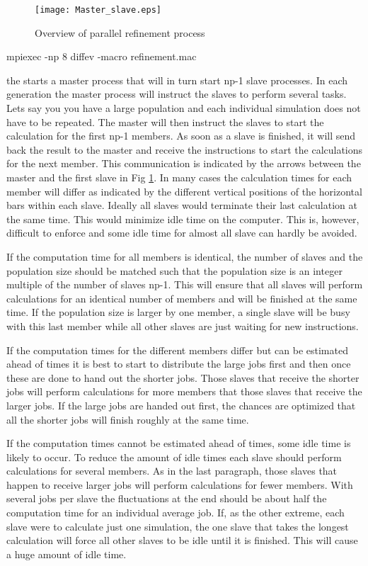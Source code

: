 \begin{figure}
   \texttt{[image: Master\_slave.eps]}
   \caption{Overview of parallel refinement process }
   \label{fevo-over}
\end{figure}

\begin{MacVerbatim}
   mpiexec -np 8 diffev -macro refinement.mac
\end{MacVerbatim}

the \Suite starts a master process that will in turn start np-1 slave 
processes. In each generation the master process will instruct the slaves
to perform several tasks. Lets say you you have a large population and
each individual simulation does not have to be repeated. The master will 
then instruct the slaves to start the calculation for the first np-1
members. As soon as a slave is finished, it will send back the result to 
the master and receive the instructions to start the calculations for
the next member. This communication is indicated by the arrows between the
 master and the first slave in Fig \ref{fevo-over}. In many cases the 
calculation times for each member will differ as indicated by the 
different vertical positions of the horizontal bars within each slave.
Ideally all slaves would terminate their last calculation at the same time. 
This would minimize idle time on the computer. This is, however,
difficult to enforce and some idle time for almost all slave can hardly be
avoided. 

If the computation time for all members is identical, the number of slaves
and the population size should be matched such that the population size is
an integer multiple of the number of slaves np-1. This will ensure that
all slaves will perform calculations for an identical number of members and
will be finished at the same time. If the population size is larger by
one member, a single slave will be busy with this last member while all
other slaves are just waiting for new instructions.

If the computation times for the different members differ but can be estimated 
ahead of times it is best to start to distribute the large jobs first and then
once these are done to hand out the shorter jobs. Those slaves that receive
the shorter jobs will perform calculations for more members that those 
slaves that receive the larger jobs. If the large jobs are handed out first, 
the chances are optimized that all the shorter jobs will finish roughly at the 
same time.

If the computation times cannot be estimated ahead of times, some idle time
is likely to occur. To reduce the amount of idle times each slave should perform
calculations for several members. As in the last paragraph, those slaves that
happen to receive larger jobs will perform calculations for fewer members. 
With several jobs per slave the fluctuations at the end should be about
half the computation time for an individual average job. 
If, as the other extreme, each slave were to 
calculate just one simulation, the one slave that takes the longest
calculation will force all other slaves to be idle until it is finished.
This will cause a huge amount of idle time.

